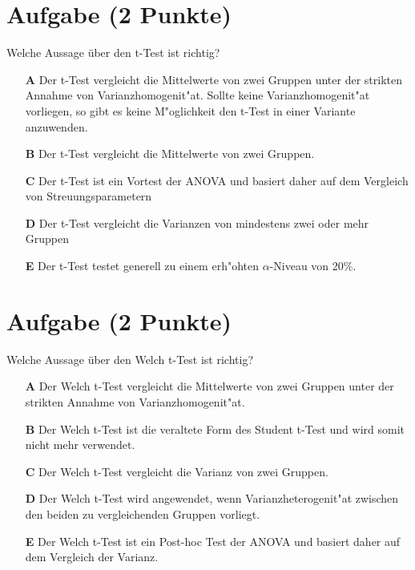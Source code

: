 \documentclass[a4paper, 9pt]{scrartcl}\usepackage[]{graphicx}\usepackage[]{xcolor}
\begin{document}
\section{Aufgabe \hfill (2 Punkte)}

Welche Aussage {\"u}ber den t-Test ist richtig?



\begin{enumerate}
\item [\textbf{A} \msquare] Der t-Test vergleicht die Mittelwerte von zwei Gruppen unter der strikten Annahme von Varianzhomogenit{"a}t. Sollte keine Varianzhomogenit{"a}t vorliegen, so gibt es keine M{"o}glichkeit den t-Test in einer Variante anzuwenden.
\item [\textbf{B} \msquare] Der t-Test vergleicht die Mittelwerte von zwei Gruppen.
\item [\textbf{C} \msquare] Der t-Test ist ein Vortest der ANOVA und basiert daher auf dem Vergleich von Streuungsparametern
\item [\textbf{D} \msquare] Der t-Test vergleicht die Varianzen von mindestens zwei oder mehr Gruppen
\item [\textbf{E} \msquare] Der t-Test testet generell zu einem erh{"o}hten $\alpha$-Niveau von 20\%.
\end{enumerate}

\section{Aufgabe \hfill (2 Punkte)}

Welche Aussage {\"u}ber den Welch t-Test ist richtig?



\begin{enumerate}
\item [\textbf{A} \msquare] Der Welch t-Test vergleicht die Mittelwerte von zwei Gruppen unter der strikten Annahme von Varianzhomogenit{"a}t.
\item [\textbf{B} \msquare] Der Welch t-Test ist die veraltete Form des Student t-Test und wird somit nicht mehr verwendet.
\item [\textbf{C} \msquare] Der Welch t-Test vergleicht die Varianz von zwei Gruppen.
\item [\textbf{D} \msquare] Der Welch t-Test wird angewendet, wenn Varianzheterogenit{"a}t zwischen den beiden zu vergleichenden Gruppen vorliegt.
\item [\textbf{E} \msquare] Der Welch t-Test ist ein Post-hoc Test der ANOVA und basiert daher auf dem Vergleich der Varianz.
\end{enumerate}
\end{document}
